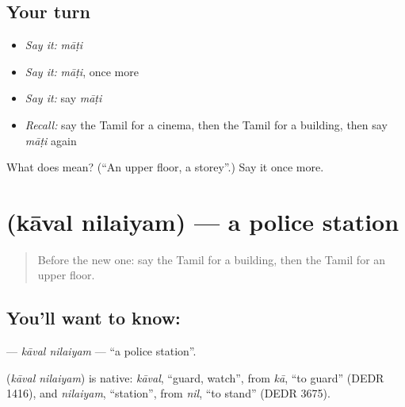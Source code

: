 \subsection*{Your turn}
\begin{itemize}
\raggedright
  \item \emph{Say it:} \emph{māṭi}
  \item \emph{Say it:} \emph{māṭi}, once more
  \item \emph{Say it:} say \emph{māṭi}
  \item \emph{Recall:} say the Tamil for a cinema, then the Tamil for a building, then say \emph{māṭi} again
\end{itemize}

\begin{tcolorbox}[breakable,colback=teal!4,colframe=teal!35!black,title={Before you move on}]
What does  mean? (\textquotedblleft{}An upper floor, a storey\textquotedblright{}.) Say it once more.
\end{tcolorbox}
\section[\texorpdfstring{\ta{காவல்} \ta{நிலையம்} (kāval nilaiyam)}{காவல் நிலையம் (kāval nilaiyam)}]{  (kāval nilaiyam) — a police station}

\label{lesson:TA-C205-kaval-nilaiyam}



\begin{quote}
Before the new one: say the Tamil for a building, then the Tamil for an upper floor.
\end{quote}

\subsection*{You'll want to know:  }
\textbf{ } — \emph{kāval nilaiyam} — \textquotedblleft{}a police station\textquotedblright{}.

\begin{cousinweb}
\textbf{ } (\emph{kāval nilaiyam}) is native: \emph{kāval}, \textquotedblleft{}guard, watch\textquotedblright{}, from \emph{kā}, \textquotedblleft{}to guard\textquotedblright{} (DEDR 1416), and \emph{nilaiyam}, \textquotedblleft{}station\textquotedblright{}, from \emph{nil}, \textquotedblleft{}to stand\textquotedblright{} (DEDR 3675).
\end{cousinweb}

